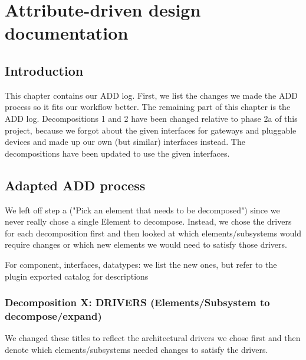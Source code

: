 \documentclass[english]{sareport}
\begin{document}
\appendix
\chapter{Attribute-driven design documentation}\label{sec:add}
    \section{Introduction}
        This chapter contains our ADD log. First, we list the changes we
        made the ADD process so it fits our workflow better. The remaining part
        of this chapter is the ADD log. Decompositions 1 and 2 have been changed
        relative to phase 2a of this project, because we forgot about the given
        interfaces for gateways and pluggable devices and made up our own
        (but similar) interfaces instead. The decompositions have been updated
        to use the given interfaces.

    \section{Adapted ADD process}
        We left off step a ("Pick an element that needs to be decomposed") since we
        never really chose a single Element to decompose. Instead, we chose the drivers
        for each decomposition first and then looked at which elements/subsystems
        would require changes or which new elements we would need to satisfy those drivers.

        For component, interfaces, datatypes: we list the new ones, but refer
        to the plugin exported catalog for descriptions

        \subsection{Decomposition X: DRIVERS (Elements/Subsystem to decompose/expand)}
            We changed these titles to reflect the architectural drivers we chose first and then
            denote which elements/subsystems needed changes to satisfy the drivers.

\end{document}
